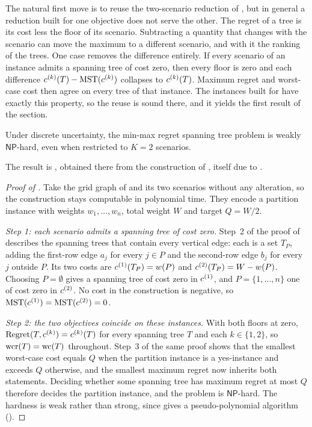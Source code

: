 The natural first move is to reuse the two-scenario reduction of , but in general a reduction built for one objective does not serve the other.
The regret of a tree is its cost less the floor of its scenario.
Subtracting a quantity that changes with the scenario can move the maximum to a different scenario, and with it the ranking of the trees.
One case removes the difference entirely.
If every scenario of an instance admits a spanning tree of cost zero, then every floor is zero and each difference $c^{(k)}(T) - \mathrm{MST}(c^{(k)})$ collapses to $c^{(k)}(T)$.
Maximum regret and worst-case cost then agree on every tree of that instance.
The instances built for  have exactly this property, so the reuse is sound there, and it yields the first result of the section.

\begin{theorem}\label{thm:regret-k2-hard}
Under discrete uncertainty, the min-max regret spanning tree problem is weakly $\mathsf{NP}$-hard, even when restricted to $K = 2$ scenarios.
\end{theorem}

The result is \cite[Theorem~8.7]{Goerigk2021RCO}, obtained there from the construction of , itself due to \textcite{KouvelisYu1997}.

\begin{proof}[Proof of ]
Take the grid graph of  and its two scenarios without any alteration, so the construction stays computable in polynomial time.
They encode a partition instance with weights $w_1, \ldots, w_n$, total weight $W$ and target $Q = W/2$.

\emph{Step 1: each scenario admits a spanning tree of cost zero.}
Step~2 of the proof of  describes the spanning trees that contain every vertical edge: each is a set $T_P$, adding the first-row edge $a_j$ for every $j \in P$ and the second-row edge $b_j$ for every $j$ outside $P$.
Its two costs are $c^{(1)}(T_P) = w(P)$ and $c^{(2)}(T_P) = W - w(P)$.
Choosing $P = \emptyset$ gives a spanning tree of cost zero in $c^{(1)}$, and $P = \{1, \ldots, n\}$ one of cost zero in $c^{(2)}$.
No cost in the construction is negative, so $\mathrm{MST}(c^{(1)}) = \mathrm{MST}(c^{(2)}) = 0$.

\emph{Step 2: the two objectives coincide on these instances.}
With both floors at zero, $\operatorname{Regret}(T,c^{(k)}) = c^{(k)}(T)$ for every spanning tree $T$ and each $k \in \{1, 2\}$, so $\mathrm{wcr}(T) = \mathrm{wc}(T)$ throughout.
Step~3 of the same proof shows that the smallest worst-case cost equals $Q$ when the partition instance is a yes-instance and exceeds $Q$ otherwise, and the smallest maximum regret now inherits both statements.
Deciding whether some spanning tree has maximum regret at most $Q$ therefore decides the partition instance, and the problem is $\mathsf{NP}$-hard.
The hardness is weak rather than strong, since  gives a pseudo-polynomial algorithm ().
\end{proof}

